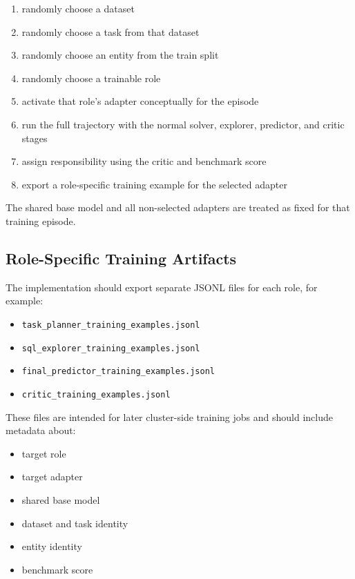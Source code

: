 \documentclass[11pt]{book}
\begin{document}
\begin{enumerate}
\item randomly choose a dataset
\item randomly choose a task from that dataset
\item randomly choose an entity from the train split
\item randomly choose a trainable role
\item activate that role's adapter conceptually for the episode
\item run the full trajectory with the normal solver, explorer, predictor, and critic stages
\item assign responsibility using the critic and benchmark score
\item export a role-specific training example for the selected adapter
\end{enumerate}

The shared base model and all non-selected adapters are treated as fixed for that training episode.

\subsection*{Role-Specific Training Artifacts}
The implementation should export separate JSONL files for each role, for example:

\begin{itemize}
\item \texttt{task\_planner\_training\_examples.jsonl}
\item \texttt{sql\_explorer\_training\_examples.jsonl}
\item \texttt{final\_predictor\_training\_examples.jsonl}
\item \texttt{critic\_training\_examples.jsonl}
\end{itemize}

These files are intended for later cluster-side training jobs and should include metadata about:

\begin{itemize}
\item target role
\item target adapter
\item shared base model
\item dataset and task identity
\item entity identity
\item benchmark score
\end{itemize}
\end{document}
